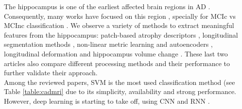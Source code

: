 The hippocampus is one of the earliest affected brain regions in AD \cite{Ballard2011}. Consequently, many works have focused on this region \cite{chincarini,Shi2017}, specially for MCIc vs MCInc classification \cite{Fiot2014,Sanroma2017}. We observe a variety of methods to extract meaningful features from the hippocampus: patch-based atrophy descriptors \cite{Sanroma2017}, longitudinal segmentation methods \cite{Platero2019}, non-linear metric learning and autoencoders \cite{Shi2017}, longitudinal deformation \cite{Fiot2012,Fiot2014} and hippocampus volume change \cite{chincarini}. These last two articles also compare different processing methods and their performance to further validate their approach. \\ 

Among the reviewed papers, SVM is the most used classification method (see Table \ref{table:cadmri} due to its simplicity, availability and strong performance. However, deep learning is starting to take off, using CNN \cite{Ortiz2017} and RNN \cite{Ghazi2019,Cui2018}. \\

